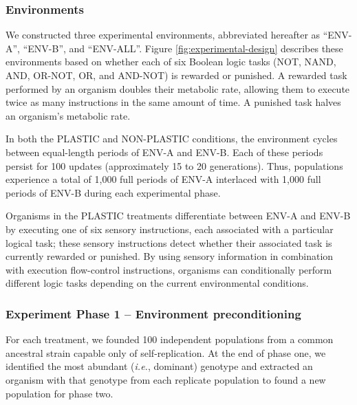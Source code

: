 \subsubsection{Environments}
\label{sec:methods:experiment:environments}


We constructed three experimental environments, abbreviated hereafter as ``ENV-A'', ``ENV-B'', and ``ENV-ALL''.
Figure \ref{fig:experimental-design} describes these environments based on whether each of six Boolean logic tasks (NOT, NAND, AND, OR-NOT, OR, and AND-NOT) is rewarded or punished.
A rewarded task performed by an organism doubles their metabolic rate, allowing them to execute twice as many instructions in the same amount of time.
A punished task halves an organism's metabolic rate. 

In both the PLASTIC and NON-PLASTIC conditions, the environment cycles between equal-length periods of ENV-A and ENV-B.
Each of these periods persist for 100 updates (approximately 15 to 20 generations).
Thus, populations experience a total of 1,000 full periods of ENV-A interlaced with 1,000 full periods of ENV-B during each experimental phase.

Organisms in the PLASTIC treatments differentiate between ENV-A and ENV-B by executing one of six sensory instructions, each associated with a particular logical task; these sensory instructions detect whether their associated task is currently rewarded or punished.
By using sensory information in combination with execution flow-control instructions, organisms can conditionally perform different logic tasks depending on the current environmental conditions.

\subsubsection{Experiment Phase 1 -- Environment preconditioning}
\label{sec:methods:experiment:phase-one}

For each treatment, we founded 100 independent populations from a common ancestral strain capable only of self-replication.
At the end of phase one, we identified the most abundant (\textit{i.e.}, dominant) genotype and extracted an organism with that genotype from each replicate population to found a new population for phase two.

